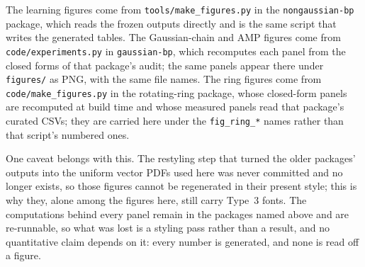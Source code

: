 The learning figures come from \texttt{tools/make\_figures.py} in the
\texttt{nongaussian-bp} package, which reads the frozen outputs directly and is
the same script that writes the generated tables. The Gaussian-chain and AMP
figures come from \texttt{code/experiments.py} in \texttt{gaussian-bp}, which
recomputes each panel from the closed forms of that package's audit; the same
panels appear there under \texttt{figures/} as PNG, with the same file names.
The ring figures come from \texttt{code/make\_figures.py} in the rotating-ring
package, whose closed-form panels are recomputed at build time and whose
measured panels read that package's curated CSVs; they are carried here under
the \texttt{fig\_ring\_*} names rather than that script's numbered ones.

One caveat belongs with this. The restyling step that turned the older
packages' outputs into the uniform vector PDFs used here was never committed and
no longer exists, so those figures cannot be regenerated in their present style;
this is why they, alone among the figures here, still carry Type~3 fonts. The
computations behind every panel remain in the packages named above and are
re-runnable, so what was lost is a styling pass rather than a result, and no
quantitative claim depends on it: every number is generated, and none is read
off a figure.

